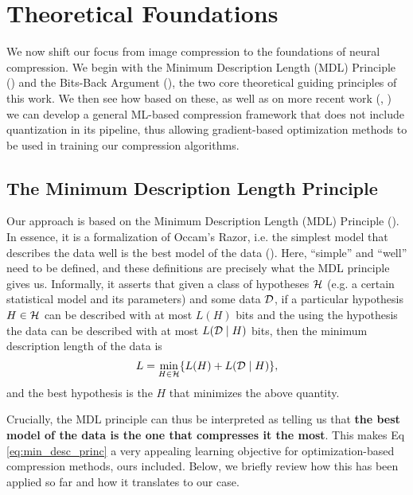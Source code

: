 \section{Theoretical Foundations}
\par
We now shift our focus from image compression to the foundations of
neural compression. We begin with the Minimum Description Length (MDL)
Principle (\cite{rissanen1986stochastic}) and the Bits-Back Argument
(\cite{hinton1993keeping}), the two core theoretical guiding
principles of this work. We then see how based on these, as well as on
more recent work (\cite{harsha2007communication}, \cite{havasi2018minimal})
we can develop a general ML-based compression framework that does not include
quantization in its pipeline, thus allowing gradient-based optimization methods
to be used in training our compression algorithms.

\subsection{The Minimum Description Length Principle} 
\label{sec:mdl}
Our approach is based on the Minimum Description Length (MDL) Principle
(\cite{rissanen1986stochastic}). In essence, it is a formalization of Occam's
Razor, i.e. the simplest model that describes the data well is the best model of
the data (\cite{grünwald2007minimum}). Here, ``simple'' and ``well'' need to be
defined, and these definitions are precisely what the MDL principle gives us.
Informally, it asserts that given a class of hypotheses $\mathcal{H}$ (e.g. a certain
statistical model and its parameters) and some data $\mathcal{D}$, if a particular
hypothesis $H \in \mathcal{H}$ can be described with at most $L(H)$ bits and the using the
hypothesis the data can be described with at most $L(\mathcal{D} \mid H)$ bits, then the
minimum description length of the data is
\begin{equation}
\label{eq:min_desc_princ}
  L = \min_{H \in \mathcal{H}}\{ L(H) + L(\mathcal{D} \mid H) \},
\end{equation}
and the best hypothesis is the $H$ that minimizes the above quantity.
\par
Crucially, the MDL principle can thus be interpreted as telling us that
\textbf{the best model of the data is the one that compresses it the most}.
This makes Eq \ref{eq:min_desc_princ} a very appealing learning objective for
optimization-based compression methods, ours included.
Below, we briefly review how this has been applied so far and how it translates
to our case.
